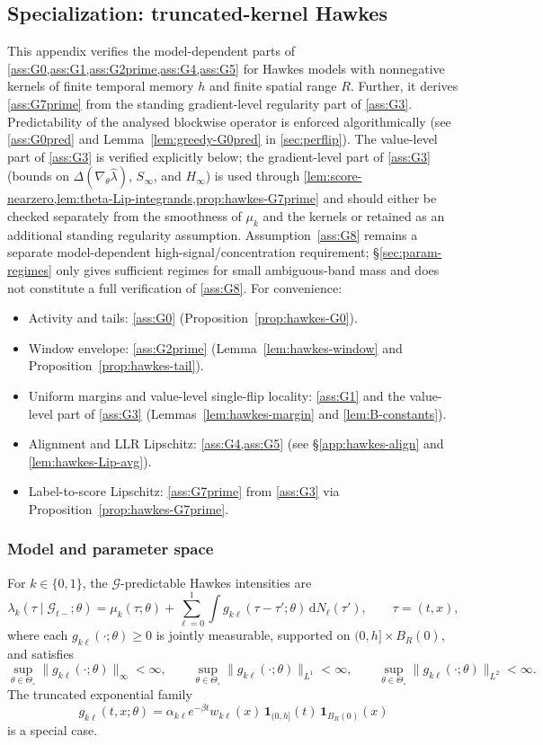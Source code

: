 \documentclass{statsoc}
\newcommand{\dd}{\mathrm{d}}
\newcommand{\1}{\mathbbm{1}}
\begin{document}
\subsection{Specialization: truncated-kernel Hawkes}\label{app:hawkes}

This appendix verifies the model-dependent parts of \cref{ass:G0,ass:G1,ass:G2prime,ass:G4,ass:G5} for Hawkes models with nonnegative kernels of finite temporal memory \(h\) and finite spatial range \(R\). Further, it derives \cref{ass:G7prime} from the standing gradient-level regularity part of \cref{ass:G3}. Predictability of the analysed blockwise operator is enforced algorithmically (see \cref{ass:G0pred} and Lemma~\ref{lem:greedy-G0pred} in \cref{sec:perflip}). The value-level part of \cref{ass:G3} is verified explicitly below; the gradient-level part of \cref{ass:G3} (bounds on \(\Delta(\nabla_\theta\widehat\lambda)\), \(S_\infty\), and \(H_\infty\)) is used through \cref{lem:score-nearzero,lem:theta-Lip-integrands,prop:hawkes-G7prime} and should either be checked separately from the smoothness of \(\mu_k\) and the kernels or retained as an additional standing regularity assumption. Assumption~\ref{ass:G8} remains a separate model-dependent high-signal/concentration requirement; \S\ref{sec:param-regimes} only gives sufficient regimes for small ambiguous-band mass and does not constitute a full verification of \cref{ass:G8}. For convenience:
\begin{itemize}[nosep]
\item Activity and tails: \cref{ass:G0} (Proposition~\ref{prop:hawkes-G0}).
\item Window envelope: \cref{ass:G2prime} (Lemma~\ref{lem:hawkes-window} and Proposition~\ref{prop:hawkes-tail}).
\item Uniform margins and value-level single-flip locality: \cref{ass:G1} and the value-level part of \cref{ass:G3} (Lemmas~\ref{lem:hawkes-margin} and \ref{lem:B-constants}).
\item Alignment and LLR Lipschitz: \cref{ass:G4,ass:G5} (see \S\ref{app:hawkes-align} and \cref{lem:hawkes-Lip-avg}).
\item Label-to-score Lipschitz: \cref{ass:G7prime} from \cref{ass:G3} via Proposition~\ref{prop:hawkes-G7prime}.
\end{itemize}

\subsubsection{Model and parameter space}
For $k\in\{0,1\}$, the $\mathcal G$-predictable Hawkes intensities are
\[
\lambda_k(\tau\mid \mathcal G_{t-};\theta)
=\mu_k(\tau;\theta)+\sum_{\ell=0}^1\int g_{k\ell}(\tau-\tau';\theta)\,\dd N_\ell(\tau'),
\qquad \tau=(t,x),
\]
where each \(g_{k\ell}(\cdot;\theta)\ge 0\) is jointly measurable, supported on \((0,h]\times B_R(0)\), and satisfies
\[
\sup_{\theta\in\Theta_\circ}\|g_{k\ell}(\cdot;\theta)\|_\infty<\infty,\qquad
\sup_{\theta\in\Theta_\circ}\|g_{k\ell}(\cdot;\theta)\|_{L^1}<\infty,\qquad
\sup_{\theta\in\Theta_\circ}\|g_{k\ell}(\cdot;\theta)\|_{L^2}<\infty.
\]
The truncated exponential family
\[
g_{k\ell}(t,x;\theta)=\alpha_{k\ell}e^{-\beta t}w_{k\ell}(x)\,\mathbf 1_{(0,h]}(t)\,\mathbf 1_{B_R(0)}(x)
\]
is a special case.
\end{document}
